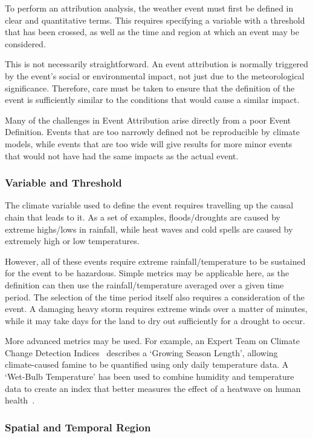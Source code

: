 To perform an attribution analysis,
    the weather event must first be defined in clear and quantitative terms.
This requires specifying a variable with a threshold that has been crossed,
    as well as the time and region at which an event may be considered.

This is not necessarily straightforward.
An event attribution is normally triggered by the event's social or environmental impact,
     not just due to the meteorological significance.
Therefore, care must be taken to ensure that the definition of the event is sufficiently similar to the conditions that would cause a similar impact.

Many of the challenges in Event Attribution arise directly from a poor Event Definition.
Events that are too narrowly defined not be reproducible by climate models,
    while events that are too wide will give results for more minor events that would not have had the same impacts as the actual event.

\subsubsection{Variable and Threshold}

The climate variable used to define the event requires travelling up the causal chain that leads to it.
As a set of examples,
    floods/droughts are caused by extreme highs/lows in rainfall,
    while heat waves and cold spells are caused by extremely high or low temperatures.

However,
    all of these events require extreme rainfall/temperature to be sustained for the event to be hazardous.
Simple metrics may be applicable here,
    as the definition can then use the rainfall/temperature averaged over a given time period.
The selection of the time period itself also requires a consideration of the event.
A damaging heavy storm requires extreme winds over a matter of minutes,
    while it may take days for the land to dry out sufficiently for a drought to occur.

More advanced metrics may be used.
For example, an Expert Team on Climate Change Detection Indices~\cite{Zhang_2011}
    describes a `Growing Season Length',
    allowing climate-caused famine to be quantified using only daily temperature data.
A `Wet-Bulb Temperature' has been used to combine humidity and temperature data to create an index that better measures the effect of a heatwave on human health~\cite{Li_2020}.

\subsubsection{Spatial and Temporal Region}

